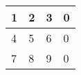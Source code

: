\begin{table}[] \begin{tabular}{|l|l|l|l|} \hline1 & 2 & 3 & 0 \\ \hline 4 & 5 & 6 & 0 \\ \hline 7 & 8 & 9 & 0\\ \hline \end{tabular} \end{table}